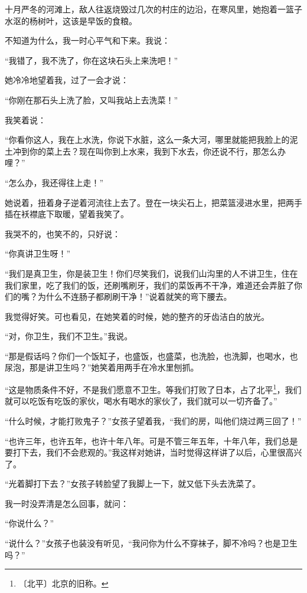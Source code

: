 \documentclass[12pt,UTF-8,openany]{ctexbook}
\begin{document}
\begin{normalsize}
    十月严冬的河滩上，敌人往返烧毁过几次的村庄的边沿，在寒风里，她抱着一篮子水沤的杨树叶，这该是早饭的食粮。
    
    不知道为什么，我一时心平气和下来。我说：
    
    “我错了，我不洗了，你在这块石头上来洗吧！”
    
    她冷冷地望着我，过了一会才说：
    
    “你刚在那石头上洗了脸，又叫我站上去洗菜！”
    
    我笑着说：
    
    “你看你这人，我在上水洗，你说下水脏，这么一条大河，哪里就能把我脸上的泥土冲到你的菜上去？现在叫你到上水来，我到下水去，你还说不行，那怎么办哩？”
    
    “怎么办，我还得往上走！”
    
    她说着，扭着身子逆着河流往上去了。登在一块尖石上，把菜篮浸进水里，把两手插在袄襟底下取暖，望着我笑了。
    
    我哭不的，也笑不的，只好说：
    
    “你真讲卫生呀！”
    
    “我们是真卫生，你是装卫生！你们尽笑我们，说我们山沟里的人不讲卫生，住在我们家里，吃了我们的饭，还刷嘴刷牙，我们的菜饭再不干净，难道还会弄脏了你们的嘴？为什么不连肠子都刷刷干净！”说着就笑的弯下腰去。
    
    我觉得好笑。可也看见，在她笑着的时候，她的整齐的牙齿洁白的放光。
    
    “对，你卫生，我们不卫生。”我说。
    
    “那是假话吗？你们一个饭缸子，也盛饭，也盛菜，也洗脸，也洗脚，也喝水，也尿泡，那是讲卫生吗？”她笑着用两手在冷水里刨抓。
    
    “这是物质条件不好，不是我们愿意不卫生。等我们打败了日本，占了北平\footnote{〔北平〕北京的旧称。}，我们就可以吃饭有吃饭的家伙，喝水有喝水的家伙了，我们就可以一切齐备了。”
    
    “什么时候，才能打败鬼子？”女孩子望着我，“我们的房，叫他们烧过两三回了！”
    
    “也许三年，也许五年，也许十年八年。可是不管三年五年，十年八年，我们总是要打下去，我们不会悲观的。”我这样对她讲，当时觉得这样讲了以后，心里很高兴了。
    
    “光着脚打下去？”女孩子转脸望了我脚上一下，就又低下头去洗菜了。
    
    我一时没弄清是怎么回事，就问：
    
    “你说什么？”
    
    “说什么？”女孩子也装没有听见，“我问你为什么不穿袜子，脚不冷吗？也是卫生吗？”
    

\end{normalsize}
\end{document}
